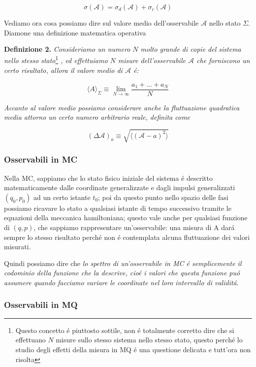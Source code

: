 $$\sigma(\mathcal{A}) = \sigma_d(\mathcal{A}) + \sigma_{c}(\mathcal{A})$$

Vediamo ora cosa possiamo dire sul valore medio dell'osservabile $\mathcal{A}$ nello stato $\Sigma$. Diamone una definizione matematica operativa 

\textbf{Definizione 2.} \textit{Consideriamo un numero $N$ molto grande di copie del sistema nello stesso stato}\footnote{Questo concetto \'e piuttosto sottile, non \'e totalmente corretto dire che si effettuano $N$ misure sullo stesso sistema nello stesso stato, questo perch\'e lo studio degli effetti della misura in MQ \'e una questione delicata e tutt'ora non risolta}
\textit{, ed effettuiamo $N$ misure dell'osservabile $\mathcal{A}$ che forniscono un certo risultato, allora il valore medio di $\mathcal{A}$ \'e:}

$$\langle A\rangle_{\Sigma}\equiv\operatorname*{lim}_{N\rightarrow\infty}{\frac{a_{1}+...+a_{N}}{N}}$$

\textit{Accanto al valore medio possiamo considerare anche la fluttuazione quadratica media attorno un certo numero arbitrario reale, definita come}

$$(\Delta\mathcal{A})_{a} \equiv \sqrt{\langle (\mathcal{A} - a)^2 \rangle}$$



\subsubsection{Osservabili in MC}

Nella MC, sappiamo che lo stato fisico iniziale del sistema \'e descritto matematicamente dalle coordinate generalizzate e dagli impulsi generalizzati $(q_0, p_0)$ ad un certo istante $t_0$; poi da questo punto nello spazio delle fasi possiamo ricavare lo stato a qualsiasi istante di tempo successivo tramite le equazioni della meccanica hamiltoniana; questo vale anche per qualsiasi funzione di $(q, p)$, che sappiamo rappresentare un'osservabile: una misura di A dar\'a sempre lo stesso risultato perch\'e non \'e contemplata alcuna fluttuazione dei valori misurati.

Quindi possiamo dire che \textit{lo spettro di un'osservabile in MC \'e semplicemente il codominio della funzione che la descrive, cio\'e i valori che questa funzione pu\'o assumere quando facciamo variare le coordinate nel loro intervallo di validit\'a}.


\subsubsection{Osservabili in MQ}

